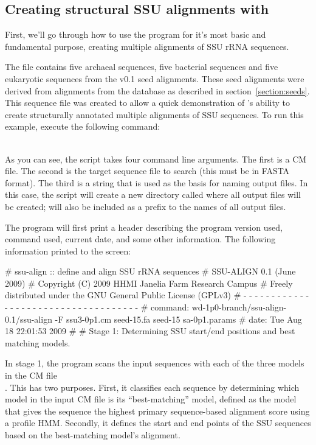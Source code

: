 \subsection{Creating structural SSU alignments with }

First, we'll go through how to use the program for
it's most basic and fundamental purpose, creating multiple
alignments of SSU rRNA sequences. 

The file  contains five archaeal sequences, five
bacterial sequences and five eukaryotic sequences from the
 v0.1 seed alignments. These seed alignments
were derived from alignments from the  database
\citep{CannoneGutell02} as described in section~\ref{section:seeds}.
This sequence file was created to allow a quick demonstration of
's ability to create structurally annotated multiple
alignments of SSU sequences. To run this example, 
execute the following command:

\\

As you can see, the  script takes four command line
arguments. The first is a CM file. The second is the target sequence
file to search (this must be in FASTA format). The third is a string
that is used as the basis for naming output files. In this case, the
script will create a new directory called  where all
output files will be created;  will also be included as a
prefix to the names of all output files.

\newpage

The program will first print a header describing the program version
used, command used, current date, and some other information. 
The following information printed to the screen:

\begin{sreoutput}
# ssu-align :: define and align SSU rRNA sequences
# SSU-ALIGN 0.1 (June 2009)
# Copyright (C) 2009 HHMI Janelia Farm Research Campus
# Freely distributed under the GNU General Public License (GPLv3)
# - - - - - - - - - - - - - - - - - - - - - - - - - - - - - - - - - - - -
# command: wd-1p0-branch/ssu-align-0.1/ssu-align -F ssu3-0p1.cm seed-15.fa seed-15 sa-0p1.params
# date:    Tue Aug 18 22:01:53 2009
#
# Stage 1: Determining SSU start/end positions and best matching models.
\end{sreoutput}

In stage 1, the program scans the input sequences with each of the
three models in the CM file \\ . This has two
purposes.  First, it classifies each sequence by determining which
model in the input CM file is its ``best-matching'' model, defined as
the model that gives the sequence the highest primary sequence-based
alignment score using a profile HMM. Secondly, it
defines the start and end points of the SSU sequences based on the
best-matching model's alignment.

